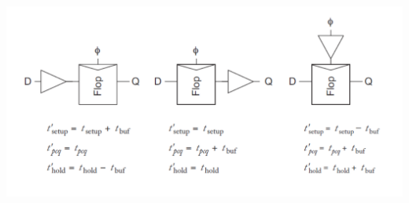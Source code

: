 \documentclass[11pt]{article}
\begin{document}
    \begin{center}
        \centering
        \vspace{-10pt}
        \includegraphics[scale=0.5]{2}
    \end{center}
    \newpage
\end{document}
